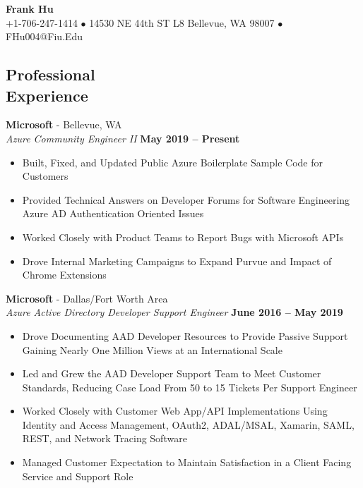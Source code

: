 \documentclass[margin,line]{resume}
\begin{document}
	{\centering \LARGE{\textbf{Frank Hu}}}
	\\
	\normalsize
	+1-706-247-1414 $\bullet$ 14530 NE 44th ST L8 Bellevue, WA 98007 $\bullet$ FHu004@Fiu.Edu
	
	\begin{resume}
	
		
	\section{\mysidestyle Professional\\Experience}
	
	\textbf{Microsoft} - Bellevue, WA \vspace{1mm}\\\vspace{1mm}
	\textsl{Azure Community Engineer II} \hfill \textbf{May 2019 -- Present}
	\begin{itemize}
		\item Built, Fixed, and Updated Public Azure Boilerplate Sample Code for Customers
		\item Provided Technical Answers on Developer Forums for Software Engineering \\Azure AD Authentication Oriented Issues
		\item Worked Closely with Product Teams to Report Bugs with Microsoft APIs
		\item Drove Internal Marketing Campaigns to Expand Purvue and Impact of Chrome Extensions
	\end{itemize}
	
	\textbf{Microsoft} - Dallas/Fort Worth Area \vspace{1mm}\\\vspace{1mm}
	\textsl{Azure Active Directory Developer Support Engineer} \hfill \textbf{June 2016 -- May 2019}
	\begin{itemize}
		 \item Drove Documenting AAD Developer Resources to Provide Passive Support Gaining Nearly One Million Views at an International Scale
		 \item Led and Grew the AAD Developer Support Team to Meet Customer Standards, Reducing Case Load From 50 to 15 Tickets Per Support Engineer 
		 \item Worked Closely with Customer Web App/API Implementations Using Identity and
		 Access Management, OAuth2, ADAL/MSAL, Xamarin, SAML, REST, and Network Tracing Software
		\item Managed Customer Expectation to Maintain Satisfaction in a Client
		Facing Service and Support Role
	\end{itemize}


\end{resume}
\end{document}
